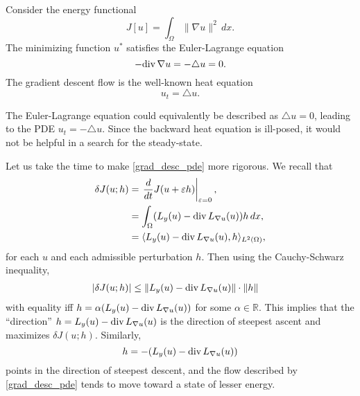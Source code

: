 \begin{example}
Consider the energy functional
\[ J[u] = \int_{\Omega} \|\nabla u\|^2 \, dx.\]
The minimizing function $u^*$ satisfies the Euler-Lagrange equation
\[-{\rm div}\, \nabla u    = - \triangle u = 0.\]
The gradient descent flow is the well-known heat equation
\[u_t = \triangle u.\]
\end{example}

The Euler-Lagrange equation could equivalently be described as $\triangle u = 0$, leading to the PDE $u_t = -\triangle u$.
Since the backward heat equation is ill-posed, it would not be helpful in a search for the steady-state.

Let us take the time to make \eqref{grad_desc_pde} more rigorous.
We recall that
\begin{align*}
        \delta J(u;h) &= \left.\frac{d}{dt}J(u + \epsilon h)\right|_{\epsilon=0},\\
        &= \int_{\Omega} (L_y(u) - {\rm div}\, L_{\nabla u}(u)) h\, dx,\\
        &= \langle L_y(u) - {\rm div}\, L_{\nabla u}(u), h \rangle_{L^2(\Omega)},
\end{align*}
for each $u$ and each admissible perturbation $h$.
Then using the Cauchy-Schwarz inequality,
\begin{align*}
    |\delta J(u;h)| &\leq \|L_y(u) - {\rm div}\, L_{\nabla u}(u)\| \cdot \| h \|
\end{align*}
with equality iff $h =\alpha(L_y(u) - {\rm div}\, L_{\nabla u}(u))$ for some $\alpha \in \mathbb{R}$.
This implies that the ``direction''
$h = L_y(u) - {\rm div}\, L_{\nabla u}(u)$ is the direction of steepest ascent and
maximizes $\delta J(u;h)$.
Similarly,
\[h = -(L_y(u) - {\rm div}\, L_{\nabla u}(u))\]
 points in the direction of steepest descent, and the flow described by \eqref{grad_desc_pde} tends to move toward a state of lesser energy.


